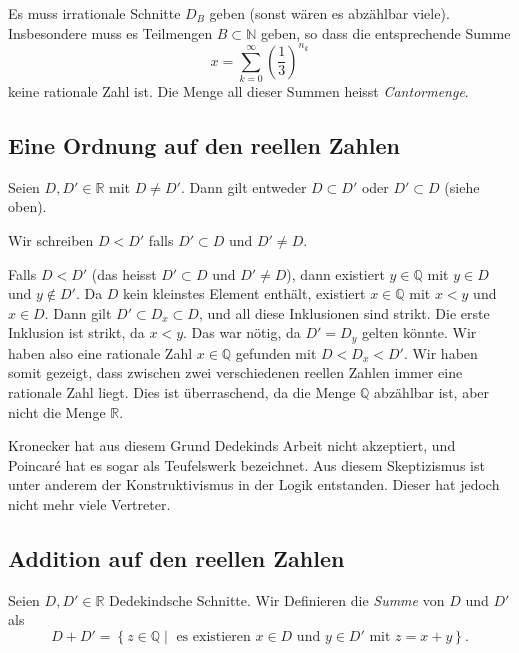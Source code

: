 \documentclass[../main.tex]{subfiles}
\begin{document}
Es muss irrationale Schnitte $D_{B}$ geben (sonst wären es abzählbar viele).
Insbesondere muss es Teilmengen $B \subset \mathbb N$ geben, so dass die
entsprechende Summe
\[x = \sum_{k=0}^{\infty} {\left(\frac{1}{3}\right)}^{n_{k}}\]
keine rationale Zahl ist.
Die Menge all dieser Summen heisst \textit{Cantormenge}.

\subsection*{Eine Ordnung auf den reellen Zahlen}
Seien $D, D' \in \mathbb R$ mit $D \neq D'$. Dann gilt entweder
$D \subset D'$ oder $D' \subset D$ (siehe oben).
\begin{definition}
  Wir schreiben $D < D'$ falls $D' \subset D$ und $D' \neq D$.
\end{definition}

\begin{remark}
  Falls $D < D'$ (das heisst $D' \subset D$ und $D' \neq D$), dann
  existiert $y \in \mathbb Q$ mit $y \in D$ und $y \notin D'$.
  Da $D$ kein kleinstes Element enthält,
  existiert $x \in \mathbb Q$ mit $x < y$ und $x \in D$.
  Dann gilt $D' \subset D_{x} \subset D$, und all diese
  Inklusionen sind strikt. Die erste Inklusion ist strikt,
  da $x < y$. Das war nötig, da $D' = D_{y}$
  gelten könnte. Wir haben also eine rationale Zahl
  $x \in \mathbb Q$ gefunden mit
  $D < D_{x} < D'$.
  Wir haben somit gezeigt, dass zwischen zwei verschiedenen reellen
  Zahlen immer eine rationale Zahl liegt.
  Dies ist überraschend, da die Menge $\mathbb Q$
  abzählbar ist, aber nicht die Menge $\mathbb R$.

  Kronecker hat aus diesem Grund Dedekinds Arbeit nicht akzeptiert,
  und Poincaré hat es sogar als Teufelswerk bezeichnet.
  Aus diesem Skeptizismus ist unter anderem der
  Konstruktivismus in der Logik entstanden.
  Dieser hat jedoch nicht mehr viele Vertreter.
\end{remark}

\subsection*{Addition auf den reellen Zahlen}

\begin{definition}
Seien $D, D' \in \mathbb R$ Dedekindsche Schnitte.
Wir Definieren die \textit{Summe} von $D$ und $D'$ als
\[D + D' = \left\{z \in \mathbb Q \mid \text{ es existieren }
    x \in D \text{ und } y \in D' \text{ mit } z = x + y\right\}.\]
\end{definition}
\end{document}
